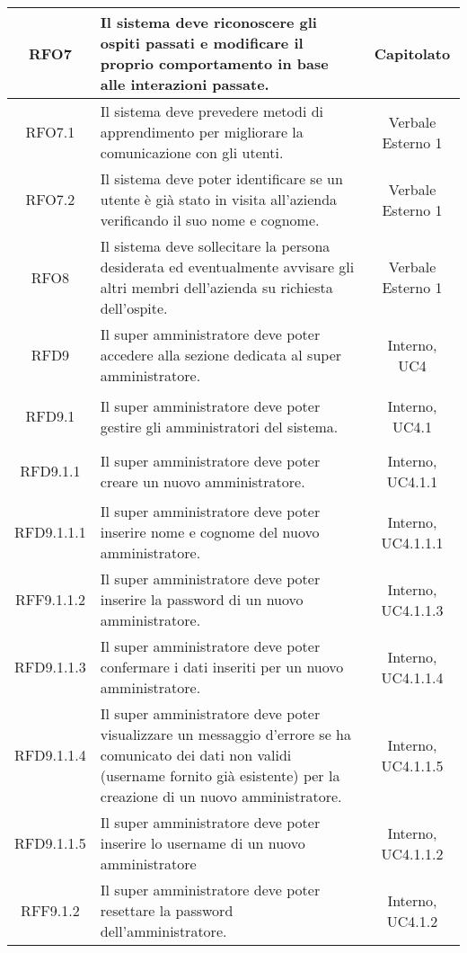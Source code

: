 \begin{longtable}{|c|>{\centering}m{7cm}|c|}
\hypertarget{RFO7}{RFO7} & Il sistema deve riconoscere gli ospiti passati e modificare il proprio comportamento in base alle interazioni passate. & Capitolato\\ \hline
\hypertarget{RFO7.1}{RFO7.1} & Il sistema deve prevedere metodi di apprendimento per migliorare la comunicazione con gli utenti. & Verbale Esterno 1\\ \hline
\hypertarget{RFO7.2}{RFO7.2} & Il sistema deve poter identificare se un utente è già stato in visita all'azienda verificando il suo nome e cognome. & Verbale Esterno 1\\ \hline
\hypertarget{RFO8}{RFO8} & Il sistema deve sollecitare la persona desiderata ed eventualmente avvisare gli altri membri dell'azienda su richiesta dell'ospite. & Verbale Esterno 1\\ \hline
\hypertarget{RFD9}{RFD9} & Il super amministratore deve poter accedere alla sezione dedicata al super amministratore. & Interno, UC4\\ \hline
\hypertarget{RFD9.1}{RFD9.1} & Il super amministratore deve poter gestire gli amministratori del sistema. & Interno, UC4.1\\ \hline
\hypertarget{RFD9.1.1}{RFD9.1.1} & Il super amministratore deve poter creare un nuovo amministratore. & Interno, UC4.1.1\\ \hline
\hypertarget{RFD9.1.1.1}{RFD9.1.1.1} & Il super amministratore deve poter inserire nome e cognome del nuovo amministratore. & Interno, UC4.1.1.1\\ \hline
\hypertarget{RFF9.1.1.2}{RFF9.1.1.2} & Il super amministratore deve poter inserire la password di un nuovo amministratore. & Interno, UC4.1.1.3\\ \hline
\hypertarget{RFD9.1.1.3}{RFD9.1.1.3} & Il super amministratore deve poter confermare i dati inseriti per un nuovo amministratore. & Interno, UC4.1.1.4\\ \hline
\hypertarget{RFD9.1.1.4}{RFD9.1.1.4} & Il super amministratore deve poter visualizzare un messaggio d'errore se ha comunicato dei dati non validi (username fornito già esistente) per la creazione di un nuovo amministratore. & Interno, UC4.1.1.5\\ \hline
\hypertarget{RFD9.1.1.5}{RFD9.1.1.5} & Il super amministratore deve poter inserire lo username di un nuovo amministratore & Interno, UC4.1.1.2\\ \hline
\hypertarget{RFF9.1.2}{RFF9.1.2} & Il super amministratore deve poter resettare la password dell'amministratore. & Interno, UC4.1.2\\ \hline

\end{longtable}
